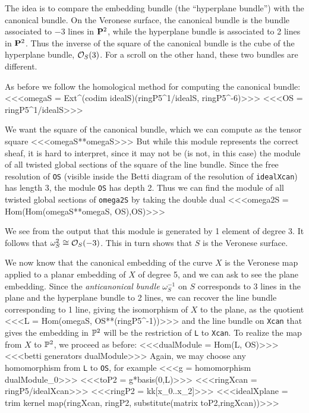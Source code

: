 The idea is to compare the embedding bundle
(the ``hyperplane bundle'') with the canonical bundle.
On the Veronese surface,  the canonical bundle is 
the bundle associated to $-3$ lines in ${\bf P}^2$,
while the hyperplane bundle is associated to
2 lines in ${\bf P}^2$. Thus the inverse of the 
square of the canonical bundle is the cube of the 
hyperplane bundle, $\O_S(3)$. For a scroll on the other hand,
these two bundles are different.

As before we follow the
homological method for computing the canonical bundle:
<<<omegaS = Ext^(codim idealS)(ringP5^1/idealS, ringP5^{-6})>>>
<<<OS = ringP5^1/idealS>>>

We want the square of the canonical bundle, which we can compute
as the tensor square
<<<omegaS**omegaS>>>
But while this module represents the correct sheaf, it is
hard to interpret, since it may not be (is not, in this case)
the module of all twisted global sections of the square of the
line bundle. Since the free resolution of {\tt OS}
(visible inside the Betti diagram of the 
resolution of {\tt idealXcan}) has length 3,
the module {\tt OS}  has depth 2. Thus we can
{}find the module of all twisted global sections
of {\tt omega2S} by taking the double dual
<<<omega2S = Hom(Hom(omegaS**omegaS, OS),OS)>>>

We see from the output that this module is
generated by 1 element of degree 3.
It follows that
$\omega_S^2\cong \cO_S(-3)$. This in turn shows
that $S$ is the Veronese surface.

We now know that the canonical embedding of the curve
$X$ is the Veronese map applied to a planar embedding
of $X$ of degree 5, and we can ask to see the plane embedding.
Since the {\it anticanonical bundle\/} $\omega_S^{-1}$
on $S$ corresponds to 3 lines
in the plane and the hyperplane bundle to 2 lines,
we can recover the line bundle corresponding to 1 line,
giving
the isomorphism of $X$ to the plane, as the quotient
<<<L = Hom(omegaS, OS**(ringP5^{-1}))>>>
and the line bundle on {\tt Xcan} that gives the
embedding in $\P^2$ will be the restriction of {\tt L}
to {\tt Xcan}. 
To realize the map from $X$ to $\P^2$, we proceed as before:
<<<dualModule = Hom(L, OS)>>>
<<<betti generators dualModule>>>
Again, we may choose any homomorphism from {\tt L}
to {\tt OS}, for example
<<<g = homomorphism dualModule_{0}>>>
<<<toP2 = g*basis(0,L)>>>
<<<ringXcan = ringP5/idealXcan>>>
<<<ringP2 = kk[x_0..x_2]>>>
<<<idealXplane = trim kernel map(ringXcan, ringP2, 
                                  substitute(matrix toP2,ringXcan))>>>

